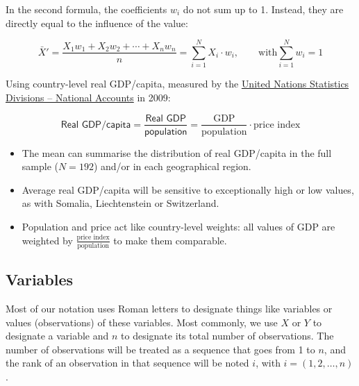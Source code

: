 



In the second formula, the coefficients $w_i$ do not sum up to 1. Instead, they are directly equal to the influence of the value:

$$\bar{X}' = \frac{X_1 w_1 + X_2 w_2 + \cdots + X_n w_n}{n} = \sum_{i=1}^N X_i \cdot w_i, \qquad \text{with} \sum_{i=1}^N w_i = 1$$


Using country-level real GDP/capita, measured by the \href{http://unstats.un.org/unsd/snaama/}{United Nations Statistics Divisions -- National Accounts} in 2009:%

$$\textsf{Real GDP/capita} = \frac{\textsf{Real GDP}}{\textsf{population}} = \frac{\text{GDP}}{\text{population}} \cdot \text{price index}$$

\begin{itemize}
	\item The mean can summarise the distribution of real GDP/capita in the full sample ($N = 192$) and/or in each geographical region.%
	
	\item Average real GDP/capita will be sensitive to exceptionally high or low values, as with Somalia, Liechtenstein or Switzerland.%
			
	\item Population and price act like country-level weights: all values of GDP are weighted by $\frac{\text{price index}}{\text{population}}$ to make them comparable.%
\end{itemize}

%
%
\subsection{Variables}%
%
Most of our notation uses Roman letters to designate things like variables or values (observations) of these variables. Most commonly, we use $X$ or $Y$ to designate a variable and $n$ to designate its total number of observations. The number of observations will be treated as a sequence that goes from 1 to $n$, and the rank of an observation in that sequence will be noted $i$, with $i = (1,2, \ldots, n)$.%

